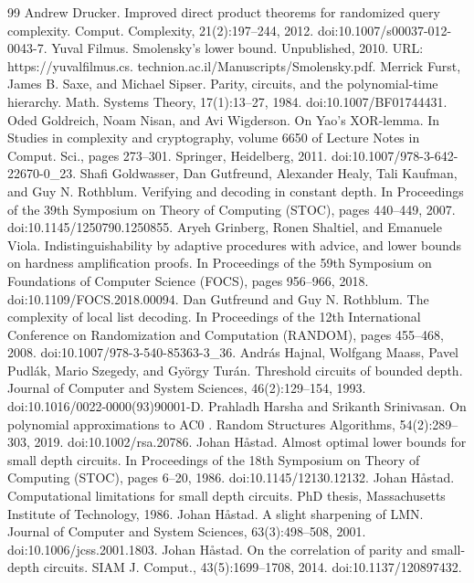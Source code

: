 \documentclass[10pt,a4paper]{article}
\begin{document}
\begin{thebibliography}{99}
 Andrew Drucker. Improved direct product theorems for randomized query complexity. Comput. Complexity, 21(2):197–244, 2012. doi:10.1007/s00037-012-0043-7.
 Yuval Filmus. Smolensky’s lower bound. Unpublished, 2010. URL: https://yuvalfilmus.cs. technion.ac.il/Manuscripts/Smolensky.pdf.
 Merrick Furst, James B. Saxe, and Michael Sipser. Parity, circuits, and the polynomial-time hierarchy. Math. Systems Theory, 17(1):13–27, 1984. doi:10.1007/BF01744431.
 Oded Goldreich, Noam Nisan, and Avi Wigderson. On Yao’s XOR-lemma. In Studies in complexity and cryptography, volume 6650 of Lecture Notes in Comput. Sci., pages 273–301. Springer, Heidelberg, 2011. doi:10.1007/978-3-642-22670-0\_23.
 Shafi Goldwasser, Dan Gutfreund, Alexander Healy, Tali Kaufman, and Guy N. Rothblum. Verifying and decoding in constant depth. In Proceedings of the 39th Symposium on Theory of Computing (STOC), pages 440–449, 2007. doi:10.1145/1250790.1250855.
 Aryeh Grinberg, Ronen Shaltiel, and Emanuele Viola. Indistinguishability by adaptive procedures with advice, and lower bounds on hardness amplification proofs. In Proceedings of the 59th Symposium on Foundations of Computer Science (FOCS), pages 956–966, 2018. doi:10.1109/FOCS.2018.00094.
 Dan Gutfreund and Guy N. Rothblum. The complexity of local list decoding. In Proceedings of the 12th International Conference on Randomization and Computation (RANDOM), pages 455–468, 2008. doi:10.1007/978-3-540-85363-3\_36.
 András Hajnal, Wolfgang Maass, Pavel Pudlák, Mario Szegedy, and György Turán. Threshold circuits of bounded depth. Journal of Computer and System Sciences, 46(2):129–154, 1993. doi:10.1016/0022-0000(93)90001-D.
 Prahladh Harsha and Srikanth Srinivasan. On polynomial approximations to AC0 . Random Structures Algorithms, 54(2):289–303, 2019. doi:10.1002/rsa.20786.
 Johan Håstad. Almost optimal lower bounds for small depth circuits. In Proceedings of the 18th Symposium on Theory of Computing (STOC), pages 6–20, 1986. doi:10.1145/12130.12132.
 Johan Håstad. Computational limitations for small depth circuits. PhD thesis, Massachusetts Institute of Technology, 1986.
 Johan Håstad. A slight sharpening of LMN. Journal of Computer and System Sciences, 63(3):498–508, 2001. doi:10.1006/jcss.2001.1803.
 Johan Håstad. On the correlation of parity and small-depth circuits. SIAM J. Comput., 43(5):1699–1708, 2014. doi:10.1137/120897432.

\end{thebibliography}
\end{document}
